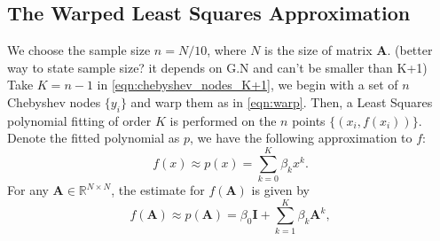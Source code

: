 \documentclass[11pt,letter]{article}
\begin{document}
\subsection{The Warped Least Squares Approximation}
We choose the sample size $n=N/10$, where $N$ is the size of matrix $\mathbf{A}$. (better way to state sample size? it depends on G.N and can't be smaller than K+1) Take $K=n-1$ in \eqref{eqn:chebyshev_nodes_K+1}, we begin with a set of $n$ Chebyshev nodes $\{y_i\}$ and warp them as in \eqref{eqn:warp}. Then, a Least Squares polynomial fitting of order $K$ is performed on the $n$ points $\{(x_i,f(x_i))\}$. Denote the fitted polynomial as $p$, we have the following approximation to $f$:
\begin{equation}
f(x)\approx p(x)= \sum_{k=0}^K \beta_k x^k.
\end{equation}
For any $\mathbf{A}\in\mathbb{R}^{N\times N}$, the estimate for $f(\mathbf{A})$ is given by
\begin{equation}
\label{eqn:warp_ls_fa}
f(\mathbf{A})\approx p(\mathbf{A})=\beta_0 \mathbf{I}+ \sum_{k=1}^K \beta_k\mathbf{A}^k,
\end{equation}
\end{document}
